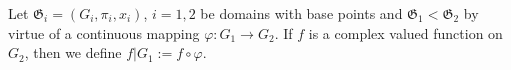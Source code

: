 Let $\mathfrak{G}_i = (G_i, \pi_i, x_i)$, $i = 1, 2$ be domains with base points and $\mathfrak{G}_1 < \mathfrak{G}_2$ by virtue of a continuous mapping $\varphi: G_1 \rightarrow G_2$. If $f$ is a complex valued function on $G_2$, then we define $f|G_1 := f \circ \varphi$.
